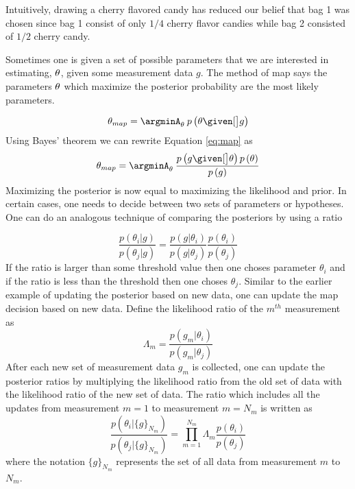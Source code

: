 Intuitively, drawing a cherry flavored candy has reduced our belief that bag 1 was chosen since bag 1 consist of only $1/4$ cherry flavor candies while bag 2 consisted of $1/2$ cherry candy. 

Sometimes one is given a set of possible parameters that we are interested in estimating, $ \mathbf{\theta} $, given some measurement data $ g $. The method of \acrfull{map} says the parameters  $ \mathbf{\theta} $ which maximize the posterior probability are the most likely parameters. 

\begin{equation}
	\mb{\theta}_{map} = \argminA_{\mb{\theta}} \: p\left( \mb{\theta} \given[\big] g \right) 
	\label{eq:map}
\end{equation} 
Using Bayes' theorem we can rewrite Equation \ref{eq:map} as 
\begin{equation}
	\mb{\theta}_{map} = \argminA_{\mb{\theta}} \: \frac{ p\left( g  \given[\big] \mb{\theta} \right) p\left( \mb{\theta} \right) } { p\left(  g \right) }
\end{equation} 
Maximizing the posterior is now equal to maximizing the likelihood and prior. In certain cases, one needs to decide between two sets of parameters or hypotheses. One can do an analogous technique of comparing the posteriors by using a ratio

\begin{equation}
	\frac{ p( \theta_i | g ) }{ p( \theta_j | g ) } = \frac{ p(g|\theta_i) }{ p(g|\theta_j)} \frac{p(\theta_i)}{p(\theta_j)}
\end{equation}
If the ratio is larger than some threshold value then one choses parameter $\theta_i$ and if the ratio is less than the threshold then one choses $\theta_j$. Similar to the earlier example of updating the posterior based on new data, one can update the \gls{map} decision based on new data. Define the likelihood ratio of the $m^{th}$ measurement as 
\begin{equation}
	\Lambda_m = \frac{ p(g_m|\theta_i) }{ p(g_m|\theta_j)}
\end{equation}
After each new set of measurement data $g_{m}$ is collected, one can update the posterior ratios by multiplying the likelihood ratio from the old set of data with the likelihood ratio of the new set of data. The ratio which includes all the updates from measurement $m = 1$ to measurement $m = N_m$ is written as
\begin{equation}
	\frac{ p( \theta_i| \{ g \} _{N_m} ) }{ p( \theta_j | \{ g \} _{N_m} ) } = \displaystyle\prod_{m=1}^{N_m} \Lambda_m \frac{p(\theta_i)}{p(\theta_j)}
\end{equation}
where the notation $\{ g \} _{N_m}$ represents the set of all data from measurement $m$ to $N_m$.

